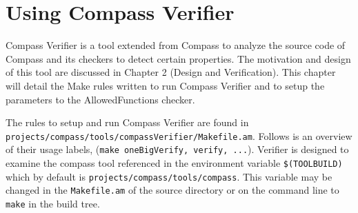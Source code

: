%
%
%

\chapter{Using Compass Verifier}

	Compass Verifier is a tool extended from Compass to analyze the source
code of Compass and its checkers to detect certain properties. The motivation
and design of this tool are discussed in Chapter 2 (Design and Verification).
This chapter will detail the Make rules written to run Compass 
Verifier and to setup the parameters to the AllowedFunctions checker.

The rules to setup and run Compass Verifier are found in 
{\tt projects/compass/tools/compassVerifier/Makefile.am}. Follows is an 
overview of their usage labels, ({\tt make oneBigVerify, verify, ...}).
Verifier is designed to examine the compass tool referenced in the environment
variable {\tt \$(TOOLBUILD)} which by default is 
{\tt projects/compass/tools/compass}. This variable may be changed in the
{\tt Makefile.am} of the source directory or on the command line to {\tt make}
in the build tree.
%
